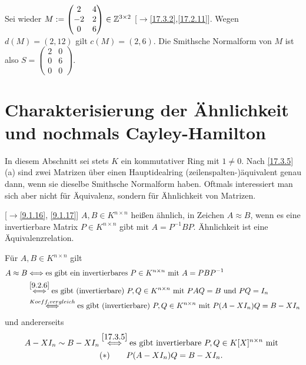 \documentclass[../../main.tex]{subfiles}
\begin{document}
\begin{bsp}\label{17.3.8}
Sei wieder $M:=\begin{pmatrix}2 & 4\\ -2&2\\ 0&6\end{pmatrix}\in \mathbb Z^{3\times 2}$ [$\to$\ref{17.3.2},\ref{17.2.11}]. Wegen $d(M)=(2,12)$ gilt $c(M)=(2,6)$. Die Smithsche Normalform von $M$ ist also $S=\begin{pmatrix}2 & 0\\ 0 & 6\\ 0&0\end{pmatrix}$.
\end{bsp}

\section{Charakterisierung der Ähnlichkeit und nochmals Cayley-Hamilton}

In diesem Abschnitt sei stets $K$ ein kommutativer Ring mit $1\neq 0$. Nach \ref{17.3.5}(a) sind zwei Matrizen über einen Hauptidealring (zeilenspalten-)äquivalent genau dann, wenn sie dieselbe Smithsche Normalform haben. Oftmals interessiert man sich aber nicht für Äquivalenz, sondern für Ähnlichkeit von Matrizen.

\begin{er}\mbox{}[$\to$\ref{9.1.16}, \ref{9.1.17}]
\label{17.4.1}
$A,B\in K^{n\times n}$ heißen ähnlich, in Zeichen $A\approx B$, wenn es eine invertierbare Matrix $P\in K^{n\times n}$ gibt mit $A=P^{-1}BP$. Ähnlichkeit ist eine Äquivalenzrelation.
\end{er}

\begin{beo}\label{17.4.2}
Für $A,B\in K^{n\times n}$ gilt
\begin{align*}
A\approx B&\Longleftrightarrow\text{es gibt ein invertierbares }P\in K^{n\times n}\text{ mit }A=PBP^{-1}\\
&\stackrel{\ref{9.2.6}}{\Longleftrightarrow}\text{es gibt (invertierbare) }P,Q\in K^{n\times n}\text{ mit }PAQ=B\text{ und }PQ=I_n\\
&\stackrel{\footnotesize{Koeff.vergleich}}{\Longleftrightarrow}\text{es gibt (invertierbare) }P,Q\in K^{n\times n}\text{ mit }P(A-XI_n)Q=B-XI_n
\end{align*}und andererseits
\begin{align*}
A-XI_n\sim B-XI_n&\stackrel{\ref{17.3.5}}{\Longleftrightarrow}\text{es gibt invertierbare }P,Q\in K[X]^{n\times n}\text{ mit }\\
&(*)\qquad P(A-XI_n)Q=B-XI_n.
\end{align*}
\end{beo}
\end{document}
